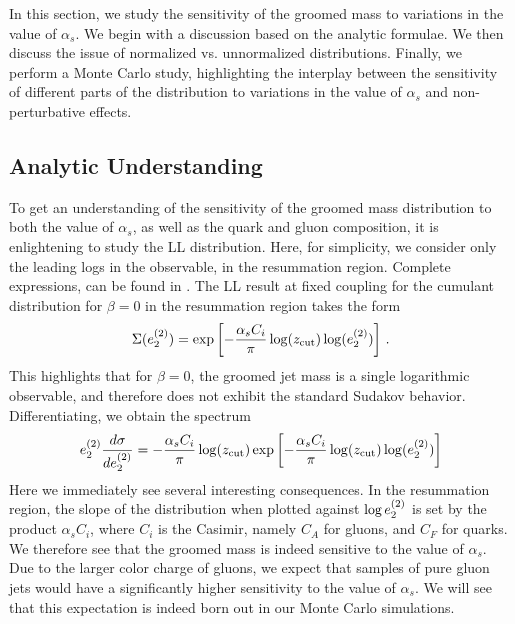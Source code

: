 
In this section, we study the sensitivity of the groomed mass to variations in the value of $\alpha_s$. We begin with a discussion based on the analytic formulae. We then discuss the issue of normalized vs. unnormalized distributions. Finally, we perform a Monte Carlo study, highlighting the interplay between the sensitivity of different parts of the distribution to variations in the value of $\alpha_s$ and non-perturbative effects.


\subsection{Analytic Understanding}\label{sec:analytic}

To get an understanding of the sensitivity of the groomed mass distribution to both the value of $\alpha_s$, as well as the quark and gluon composition, it is enlightening to study the LL distribution. Here, for simplicity, we consider only the leading logs in the observable, in the resummation region. Complete expressions, can be found in \cite{Larkoski:2014wba,Frye:2016aiz,Marzani:2017kqd,Marzani:2017mva}. The LL result at fixed coupling for the cumulant distribution for $\beta=0$ in the resummation region takes the form
\begin{align}
\Sigma(e_{2}^{(2)})=\exp\left[ - \frac{\alpha_s C_i}{\pi} \log(z_{\rm cut}) \log (e_{2}^{(2)}) \right]\,.
\end{align}
This highlights that for $\beta=0$, the groomed jet mass is a single logarithmic observable, and therefore does not exhibit the standard Sudakov behavior.
Differentiating, we obtain the spectrum
\begin{align}
e_{2}^{(2)}  \frac{d\sigma}{d e_{2}^{(2)}}=   - \frac{\alpha_s C_i}{\pi} \log(z_{\rm cut})   \exp\left[ - \frac{\alpha_s C_i}{\pi}  \log(z_{\rm cut}) \log (e_{2}^{(2)}) \right]
\end{align}
Here we immediately see several interesting consequences. In the resummation region, the slope of the distribution when plotted against $\log e_{2}^{(2)}$ is set by the product $\alpha_s C_i$, where $C_i$ is the Casimir, namely $C_A$ for gluons, and $C_F$ for quarks. We therefore see that the groomed mass is indeed sensitive to the value of $\alpha_s$. Due to the larger color charge of gluons, we expect that samples of pure gluon jets would have a significantly higher sensitivity to the value of $\alpha_s$.  We will see that this expectation is indeed born out in our Monte Carlo simulations.  

